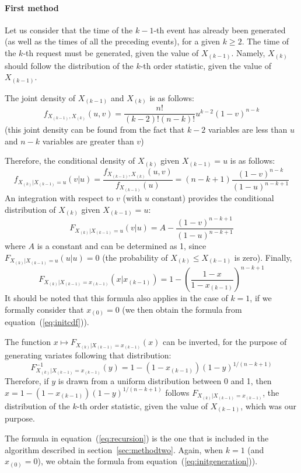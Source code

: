 \documentclass[12pt]{article} %
\begin{document}
\paragraph{First method}
Let us consider that the time of the $k-1$-th event has already been generated (as well as the times of all the preceding events), for a given $k \geq 2$. The time of the $k$-th request must be generated, given the value of $X_{(k-1)}$. Namely, $X_{(k)}$ should follow the distribution of the $k$-th order statistic, given the value of $X_{(k-1)}$.\par
The joint density of $X_{(k-1)}$ and $X_{(k)}$ is as follows:
\begin{equation}
f_{X_{(k-1)},X_{(k)}} (u,v) = \frac{n!}{(k-2)!(n-k)!}u^{k-2}(1-v)^{n-k}
\end{equation}
(this joint density can be found from the fact that $k-2$ variables are less than $u$ and $n-k$ variables are greater than $v$)\par
Therefore, the conditional density of $X_{(k)}$ given $X_{(k-1)}=u$ is as follows:
\begin{equation}
f_{X_{(k)}|X_{(k-1)}=u} (v|u) = \frac{f_{X_{(k-1)},X_{(k)}} (u,v)}{f_{X_{(k-1)}} (u)} = (n-k+1)\frac{(1-v)^{n-k}}{(1-u)^{n-k+1}}
\end{equation}
An integration with respect to $v$ (with $u$ constant) provides the conditional distribution of $X_{(k)}$ given $X_{(k-1)}=u$:
\begin{equation}
F_{X_{(k)}|X_{(k-1)}=u} (v|u) = A - \frac{(1-v)^{n-k+1}}{(1-u)^{n-k+1}}
\end{equation}
where $A$ is a constant and can be determined as 1, since $F_{X_{(k)}|X_{(k-1)}=u} (u|u) = 0$ (the probability of $X_{(k)}\leq X_{(k-1)}$ is zero). Finally,
\begin{equation}
F_{X_{(k)}|X_{(k-1)}=x_{(k-1)}} (x|x_{(k-1)}) = 1 - \left(\frac{1-x}{1-x_{(k-1)}}\right)^{n-k+1}
\end{equation}
It should be noted that this formula also applies in the case of
$k=1$, if we formally consider that $x_{(0)}=0$ (we then obtain the
formula from equation~(\ref{eq:initcdf})).\par
The function $x\mapsto F_{X_{(k)}|X_{(k-1)}=x_{(k-1)}}(x)$ can be
inverted, for the purpose of generating variates following that
distribution:
\begin{equation}\label{eq:recursion}
F^{-1}_{X_{(k)}|X_{(k-1)}=x_{(k-1)}} (y) = 1- (1-x_{(k-1)})(1-y)^{1/(n-k+1)}
\end{equation}
Therefore, if $y$ is drawn from a uniform distribution between 0 and 1,
then $x=1-(1-x_{(k-1)})(1-y)^{1/(n-k+1)}$ follows $F_{X_{(k)}|X_{(k-1)}=x_{(k-1)}}$,
the distribution of the $k$-th order statistic, given the value of $X_{(k-1)}$,
which was our purpose.\par
The formula in equation~(\ref{eq:recursion}) is the one that is
included in the algorithm described in section~\ref{sec:methodtwo}.
Again, when $k=1$ (and $x_{(0)}=0$), we obtain the formula from
equation~(\ref{eq:initgeneration})).
%
%
\end{document}
